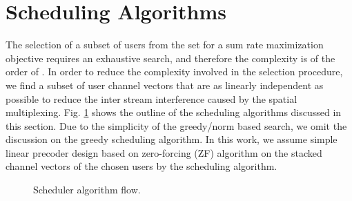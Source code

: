 \documentclass[conference,letterpaper,10pt]{./../../IEEE/IEEEtran}
\begin{document}
\section{Scheduling Algorithms}
\label{sec:sched_discussions}
The selection of a subset of users  from the set  for a sum rate maximization objective requires an exhaustive search, and therefore the complexity is of the order of . In order to reduce the complexity involved in the selection procedure, we find a subset of user channel vectors that are as linearly independent as possible to reduce the inter stream interference caused by the spatial multiplexing. Fig. \ref{kuva:scheduler_block_diag} shows the outline of the scheduling algorithms discussed in this section. Due to the simplicity of the greedy/norm based search, we omit the discussion on the greedy scheduling algorithm. In this work, we assume simple linear precoder design based on zero-forcing (ZF) algorithm on the stacked channel vectors of the chosen users by the scheduling algorithm.
\begin{figure}
	\centering
	\caption{Scheduler algorithm flow.}
	\label{kuva:scheduler_block_diag}
	 \vspace{-0.1in}
\end{figure}
\end{document}
